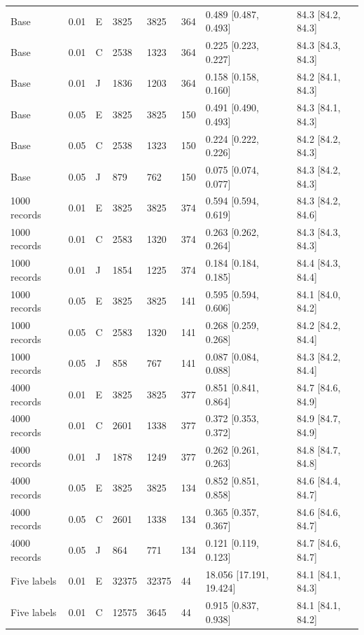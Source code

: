 \begin{tabular}{llllllll}
Base & 0.01 & E & 3825 & 3825 & 364 & 0.489 [0.487, 0.493] & 84.3 [84.2, 84.3] \\
Base & 0.01 & C & 2538 & 1323 & 364 & 0.225 [0.223, 0.227] & 84.3 [84.3, 84.3] \\
Base & 0.01 & J & 1836 & 1203 & 364 & 0.158 [0.158, 0.160] & 84.2 [84.1, 84.3] \\
Base & 0.05 & E & 3825 & 3825 & 150 & 0.491 [0.490, 0.493] & 84.3 [84.1, 84.3] \\
Base & 0.05 & C & 2538 & 1323 & 150 & 0.224 [0.222, 0.226] & 84.2 [84.2, 84.3] \\
Base & 0.05 & J & 879 & 762 & 150 & 0.075 [0.074, 0.077] & 84.3 [84.2, 84.3] \\
1000 records & 0.01 & E & 3825 & 3825 & 374 & 0.594 [0.594, 0.619] & 84.3 [84.2, 84.6] \\
1000 records & 0.01 & C & 2583 & 1320 & 374 & 0.263 [0.262, 0.264] & 84.3 [84.3, 84.3] \\
1000 records & 0.01 & J & 1854 & 1225 & 374 & 0.184 [0.184, 0.185] & 84.4 [84.3, 84.4] \\
1000 records & 0.05 & E & 3825 & 3825 & 141 & 0.595 [0.594, 0.606] & 84.1 [84.0, 84.2] \\
1000 records & 0.05 & C & 2583 & 1320 & 141 & 0.268 [0.259, 0.268] & 84.2 [84.2, 84.4] \\
1000 records & 0.05 & J & 858 & 767 & 141 & 0.087 [0.084, 0.088] & 84.3 [84.2, 84.4] \\
4000 records & 0.01 & E & 3825 & 3825 & 377 & 0.851 [0.841, 0.864] & 84.7 [84.6, 84.9] \\
4000 records & 0.01 & C & 2601 & 1338 & 377 & 0.372 [0.353, 0.372] & 84.9 [84.7, 84.9] \\
4000 records & 0.01 & J & 1878 & 1249 & 377 & 0.262 [0.261, 0.263] & 84.8 [84.7, 84.8] \\
4000 records & 0.05 & E & 3825 & 3825 & 134 & 0.852 [0.851, 0.858] & 84.6 [84.4, 84.7] \\
4000 records & 0.05 & C & 2601 & 1338 & 134 & 0.365 [0.357, 0.367] & 84.6 [84.6, 84.7] \\
4000 records & 0.05 & J & 864 & 771 & 134 & 0.121 [0.119, 0.123] & 84.7 [84.6, 84.7] \\
Five labels & 0.01 & E & 32375 & 32375 & 44 & 18.056 [17.191, 19.424] & 84.1 [84.1, 84.3] \\
Five labels & 0.01 & C & 12575 & 3645 & 44 & 0.915 [0.837, 0.938] & 84.1 [84.1, 84.2] \\

\end{tabular}
